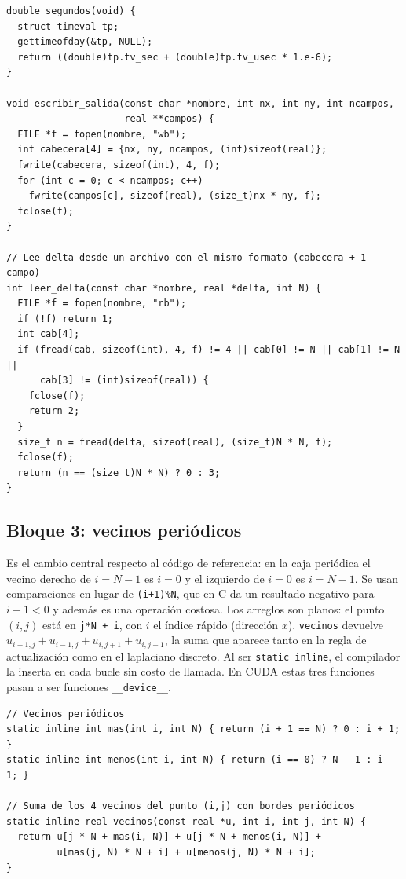 \begin{appendix}
\begin{lstlisting}
double segundos(void) {
  struct timeval tp;
  gettimeofday(&tp, NULL);
  return ((double)tp.tv_sec + (double)tp.tv_usec * 1.e-6);
}

void escribir_salida(const char *nombre, int nx, int ny, int ncampos,
                     real **campos) {
  FILE *f = fopen(nombre, "wb");
  int cabecera[4] = {nx, ny, ncampos, (int)sizeof(real)};
  fwrite(cabecera, sizeof(int), 4, f);
  for (int c = 0; c < ncampos; c++)
    fwrite(campos[c], sizeof(real), (size_t)nx * ny, f);
  fclose(f);
}

// Lee delta desde un archivo con el mismo formato (cabecera + 1 campo)
int leer_delta(const char *nombre, real *delta, int N) {
  FILE *f = fopen(nombre, "rb");
  if (!f) return 1;
  int cab[4];
  if (fread(cab, sizeof(int), 4, f) != 4 || cab[0] != N || cab[1] != N ||
      cab[3] != (int)sizeof(real)) {
    fclose(f);
    return 2;
  }
  size_t n = fread(delta, sizeof(real), (size_t)N * N, f);
  fclose(f);
  return (n == (size_t)N * N) ? 0 : 3;
}
\end{lstlisting}

\subsection{Bloque 3: vecinos periódicos}

Es el cambio central respecto al código de referencia: en la caja periódica el vecino derecho de $i=N-1$ es $i=0$ y el izquierdo de $i=0$ es $i=N-1$. Se usan comparaciones en lugar de \texttt{(i+1)\%N}, que en C da un resultado negativo para $i-1<0$ y además es una operación costosa. Los arreglos son planos: el punto $(i,j)$ está en \texttt{j*N + i}, con $i$ el índice rápido (dirección $x$). \texttt{vecinos} devuelve $u_{i+1,j}+u_{i-1,j}+u_{i,j+1}+u_{i,j-1}$, la suma que aparece tanto en la regla de actualización como en el laplaciano discreto. Al ser \texttt{static inline}, el compilador la inserta en cada bucle sin costo de llamada. En CUDA estas tres funciones pasan a ser funciones \texttt{\_\_device\_\_}.

\begin{lstlisting}
// Vecinos periódicos
static inline int mas(int i, int N) { return (i + 1 == N) ? 0 : i + 1; }
static inline int menos(int i, int N) { return (i == 0) ? N - 1 : i - 1; }

// Suma de los 4 vecinos del punto (i,j) con bordes periódicos
static inline real vecinos(const real *u, int i, int j, int N) {
  return u[j * N + mas(i, N)] + u[j * N + menos(i, N)] +
         u[mas(j, N) * N + i] + u[menos(j, N) * N + i];
}
\end{lstlisting}


\end{appendix}
